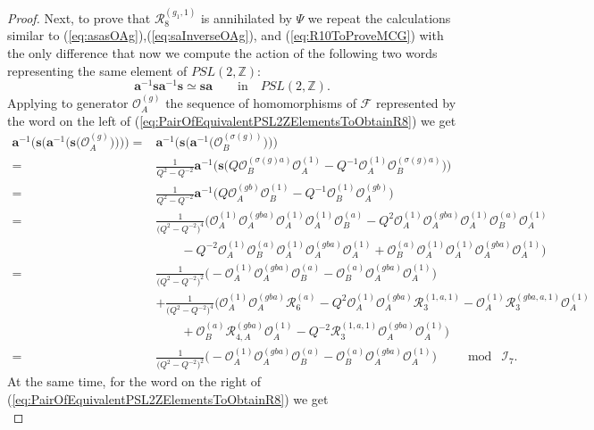 \documentclass{amsart}
\newcommand{\Oa}{\mathcal O_A}
\newcommand{\Ob}{\mathcal O_B}
\newcommand{\R}{\mathcal R}
\begin{document}
\begin{proof}
Next, to prove that $\R_8^{(g_1,1)}$ is annihilated by $\Psi$ we repeat the calculations similar to (\ref{eq:asasOAg}),(\ref{eq:saInverseOAg}), and (\ref{eq:R10ToProveMCG}) with the only difference that now we compute the action of the following two words representing the same element of $PSL(2,\mathbb Z)$:
\begin{equation}
\mathbf a^{-1}\mathbf s\mathbf a^{-1}\mathbf s\simeq\mathbf s\mathbf a\qquad \textrm{in}\quad PSL(2,\mathbb Z).
\label{eq:PairOfEquivalentPSL2ZElementsToObtainR8}
\end{equation}
Applying to generator $\Oa^{(g)}$ the sequence of homomorphisms of $\mathcal F$ represented by the word on the left of (\ref{eq:PairOfEquivalentPSL2ZElementsToObtainR8}) we get
\begin{equation}
\begin{aligned}
\mathbf a^{-1}\big(\mathbf s\big(\mathbf a^{-1}\big(\mathbf s\big(\Oa^{(g)}\big)\big)\big)\big)=&\mathbf a^{-1}\big(\mathbf s\big(\mathbf a^{-1}\big(\Ob^{(\sigma(g))}\big)\big)\big)\\
=&\frac1{Q^2-Q^{-2}}\mathbf a^{-1}\Big(\mathbf s\Big(Q\Ob^{(\sigma(g)a)}\Oa^{(1)}-Q^{-1}\Oa^{(1)}\Ob^{(\sigma(g)a)}\Big)\Big)\\
=&\frac1{Q^2-Q^{-2}}\mathbf a^{-1}\Big(Q\Oa^{(gb)}\Ob^{(1)}-Q^{-1}\Ob^{(1)}\Oa^{(gb)}\Big)\\
=&\frac1{\big(Q^2-Q^{-2}\big)^4}\Big(\Oa^{(1)}\Oa^{(gba)}\Oa^{(1)}\Oa^{(1)}\Ob^{(a)}-Q^2\Oa^{(1)}\Oa^{(gba)}\Oa^{(1)}\Ob^{(a)}\Oa^{(1)}\\
&\qquad-Q^{-2}\Oa^{(1)}\Ob^{(a)}\Oa^{(1)}\Oa^{(gba)}\Oa^{(1)}+\Ob^{(a)}\Oa^{(1)}\Oa^{(1)}\Oa^{(gba)}\Oa^{(1)}\Big)\\
=&\frac1{\big(Q^2-Q^{-2}\big)^2}\Big(-\Oa^{(1)}\Oa^{(gba)}\Ob^{(a)}-\Ob^{(a)}\Oa^{(gba)}\Oa^{(1)}\Big)\\
&+\frac1{\big(Q^2-Q^{-2}\big)^4}\Big(\Oa^{(1)}\Oa^{(gba)}\R_{6}^{(a)}-Q^2\Oa^{(1)}\Oa^{(gba)}\R_{3}^{(1,a,1)}-\Oa^{(1)}\R_{3}^{(gba,a,1)}\Oa^{(1)}\\
&\qquad+\Ob^{(a)}\R_{4,A}^{(gba)}\Oa^{(1)}-Q^{-2}\R_{3}^{(1,a,1)}\Oa^{(gba)}\Oa^{(1)}\Big)\\
=&\frac1{\big(Q^2-Q^{-2}\big)^2}\Big(-\Oa^{(1)}\Oa^{(gba)}\Ob^{(a)}-\Ob^{(a)}\Oa^{(gba)}\Oa^{(1)}\Big)\qquad\bmod\;\mathcal I_7.
\end{aligned}
\label{eq:aInversesaInversesOag}
\end{equation}
At the same time, for the word on the right of (\ref{eq:PairOfEquivalentPSL2ZElementsToObtainR8}) we get
\begin{equation}

\end{equation}
\end{proof}
\end{document}
